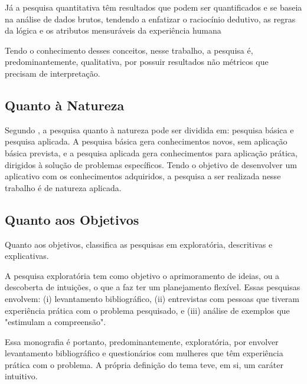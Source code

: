 Já a pesquisa quantitativa têm resultados que podem ser quantificados e se baseia na 
análise de dados brutos, tendendo a enfatizar o raciocínio dedutivo, as regras da lógica 
e os atributos mensuráveis da experiência humana

Tendo o conhecimento desses conceitos, nesse trabalho, a pesquisa é, predominantemente, 
qualitativa, por possuir resultados não métricos que precisam de interpretação. 


\subsection{Quanto à Natureza}

Segundo , a pesquisa quanto à natureza pode ser dividida em: pesquisa 
básica e pesquisa aplicada. A pesquisa básica gera conhecimentos novos, sem aplicação básica 
prevista, e a pesquisa aplicada gera conhecimentos para aplicação prática, dirigidos à solução de 
problemas específicos. Tendo o objetivo de desenvolver um aplicativo com os conhecimentos 
adquiridos, a pesquisa a ser realizada nesse trabalho é de natureza aplicada.

 
\subsection{Quanto aos Objetivos}

Quanto aos objetivos,  classifica as pesquisas em exploratória, 
descritivas e explicativas. 

A pesquisa exploratória tem como objetivo o aprimoramento 
de ideias, ou a descoberta de intuições, o que a faz ter um planejamento flexível. 
Essas pesquisas envolvem: (i) levantamento bibliográfico, (ii) entrevistas com pessoas 
que tiveram experiência prática com o problema pesquisado, e (iii) análise de exemplos que 
"estimulam a compreensão".



Essa monografia é portanto, predominantemente, exploratória, 
por envolver levantamento bibliográfico e questionários com mulheres que têm experiência 
prática com o problema. A própria definição do tema teve, em si, um caráter intuitivo. 

